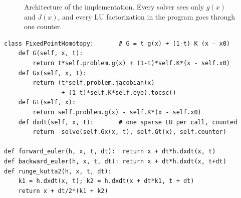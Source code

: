 \documentclass[sigconf,nonacm]{acmart}
\begin{document}
\begin{figure}[t]
\caption{Architecture of the implementation. Every solver sees only $g(x)$ and $J(x)$, and every LU
factorization in the program goes through one counter.}
\label{fig:arch}
\end{figure}

\begin{lstlisting}[style=py,caption={The core of the method (\texttt{homotopy/fpv.py}, \texttt{homotopy/integrators.py}), lightly trimmed.},label=lst:core,float=t]
class FixedPointHomotopy:       # G = t g(x) + (1-t) K (x - x0)
    def G(self, x, t):
        return t*self.problem.g(x) + (1-t)*self.K*(x - self.x0)
    def Gx(self, x, t):
        return (t*self.problem.jacobian(x)
                + (1-t)*self.K*self.eye).tocsc()
    def Gt(self, x):
        return self.problem.g(x) - self.K*(x - self.x0)
    def dxdt(self, x, t):       # one sparse LU per call, counted
        return -solve(self.Gx(x, t), self.Gt(x), self.counter)

def forward_euler(h, x, t, dt):  return x + dt*h.dxdt(x, t)
def backward_euler(h, x, t, dt): return x + dt*h.dxdt(x, t+dt)
def runge_kutta2(h, x, t, dt):
    k1 = h.dxdt(x, t); k2 = h.dxdt(x + dt*k1, t + dt)
    return x + dt/2*(k1 + k2)
\end{lstlisting}
\end{document}
